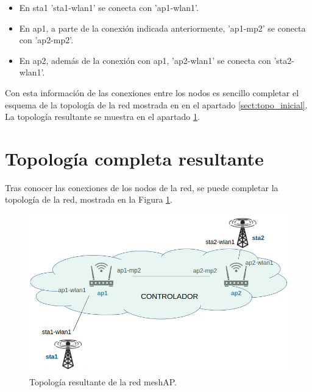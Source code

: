\documentclass[a4paper,12pt,twoside,spanish]{book}
\begin{document}
\begin{itemize}
	\item En sta1 'sta1-wlan1' se conecta con 'ap1-wlan1'.
	\item En ap1, a parte de la conexión indicada anteriormente, 'ap1-mp2' se conecta con 'ap2-mp2'.
	\item En ap2, además de la conexión con ap1, 'ap2-wlan1' se conecta con 'sta2-wlan1'.
\end{itemize}

Con esta información de las conexiones entre los nodos es sencillo completar el esquema de la topología de la red mostrada en en el apartado \ref{sect:topo_inicial}. La topología resultante se muestra en el apartado \ref{sect:topo_completa}.\par 

\section{Topología completa resultante}\label{sect:topo_completa}

Tras conocer las conexiones de los nodos de la red, se puede completar la topología de la red, mostrada en la Figura \ref{fig:topo_completa}.\par

	\begin{figure}[!h]
		\centering
		\includegraphics[scale=.4]{Figuras/topo_completa.png}
		\caption{Topología resultante de la red meshAP.}
		\label{fig:topo_completa}
	\end{figure}
\end{document}
